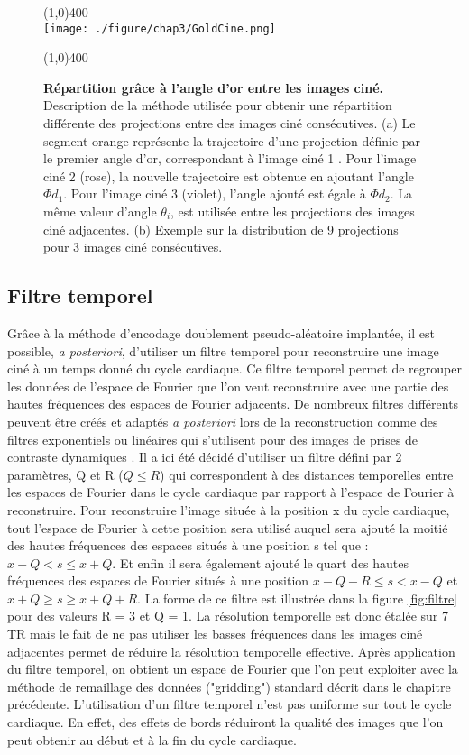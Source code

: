 \begin{figure}[H]
\centering \line(1,0){400} \\
\texttt{[image: ./figure/chap3/GoldCine.png]}
\caption[Répartition grâce à l'angle d'or entre les images ciné.]{\label{fig:GoldCine} \textbf{Répartition grâce à l'angle d'or entre les images ciné.} Description de la méthode utilisée pour obtenir une répartition différente des projections entre des images ciné consécutives. (a) Le segment orange représente la trajectoire d'une projection définie par le premier angle d'or, correspondant à l'image ciné 1 . Pour l'image ciné 2 (rose), la nouvelle trajectoire est obtenue en ajoutant l'angle $\Phi d_1$. Pour l'image ciné 3 (violet), l'angle ajouté est égale à $\Phi d_2$. La même valeur d'angle $\theta_i$, est utilisée entre les projections des images ciné adjacentes. (b) Exemple sur la distribution de 9 projections pour 3 images ciné consécutives.}
\line(1,0){400} \\ \end{figure}

\subsection{Filtre temporel}

Grâce à la méthode d’encodage doublement pseudo-aléatoire implantée, il est possible, \textit{a posteriori}, d’utiliser un filtre temporel pour reconstruire une image ciné à un temps donné du cycle cardiaque. Ce filtre temporel permet de regrouper les données de l'espace de Fourier que l'on veut reconstruire avec une partie des hautes fréquences des espaces de Fourier adjacents. De nombreux filtres différents peuvent être créés et adaptés \textit{a posteriori} lors de la reconstruction comme des filtres exponentiels ou linéaires qui s'utilisent pour des images de prises de contraste dynamiques \cite{Lin:2008uq}.
Il a ici été décidé d'utiliser un filtre défini par 2 paramètres, Q et R ($Q \leq R$) qui correspondent à des distances temporelles entre les espaces de Fourier dans le cycle cardiaque par rapport à l'espace de Fourier à reconstruire. Pour reconstruire l'image située à la position x du cycle cardiaque, tout l'espace de Fourier à cette position sera utilisé auquel sera ajouté la moitié des hautes fréquences des espaces situés à une position s tel que : $x-Q < s \leq x+Q$. Et enfin il sera également ajouté le quart des hautes fréquences des espaces de Fourier situés à une position $x-Q-R \leq s < x-Q$ et $x+Q \geq s \geq x+Q+R$. La forme de ce filtre est illustrée dans la figure \ref{fig:filtre} pour des valeurs R = 3 et Q = 1.
La résolution temporelle est donc étalée sur 7 TR mais le fait de ne pas utiliser les basses fréquences dans les images ciné adjacentes permet de réduire la résolution temporelle effective.
Après application du filtre temporel, on obtient un espace de Fourier que l'on peut exploiter avec la méthode de remaillage des données ("gridding") standard décrit dans le chapitre précédente.
L'utilisation d'un filtre temporel n'est pas uniforme sur tout le cycle cardiaque. En effet, des effets de bords réduiront la qualité des images que l'on peut obtenir au début et à la fin du cycle cardiaque.

